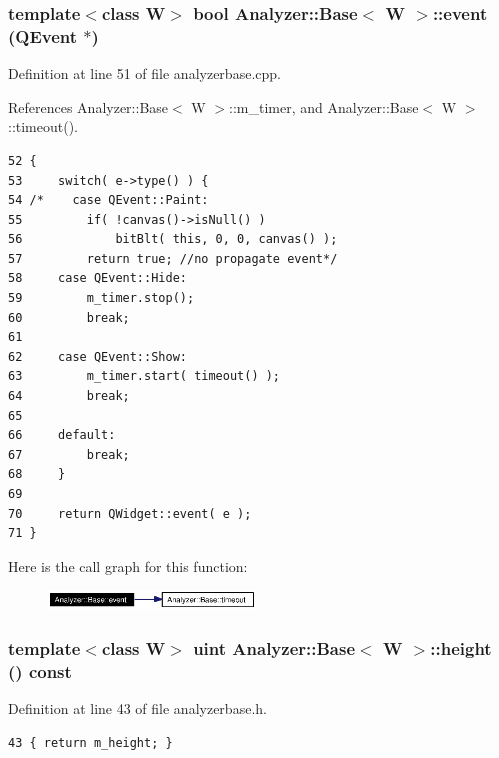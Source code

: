 \subsubsection{\setlength{\rightskip}{0pt plus 5cm}template$<$class W$>$ bool {\bf Analyzer::Base}$<$ W $>$::event (QEvent $\ast$)\hspace{0.3cm}{\tt  [private]}}\label{classAnalyzer_1_1Base_Analyzer_1_1Based0}




Definition at line 51 of file analyzerbase.cpp.

References Analyzer::Base$<$ W $>$::m\_\-timer, and Analyzer::Base$<$ W $>$::timeout().



\footnotesize\begin{verbatim}52 {
53     switch( e->type() ) {
54 /*    case QEvent::Paint:
55         if( !canvas()->isNull() )
56             bitBlt( this, 0, 0, canvas() );
57         return true; //no propagate event*/
58     case QEvent::Hide:
59         m_timer.stop();
60         break;
61 
62     case QEvent::Show:
63         m_timer.start( timeout() );
64         break;
65 
66     default:
67         break;
68     }
69 
70     return QWidget::event( e );
71 }
\end{verbatim}\normalsize 


Here is the call graph for this function:\begin{figure}[H]
\begin{center}
\leavevmode
\includegraphics[width=156pt]{classAnalyzer_1_1Base_Analyzer_1_1Based0_cgraph}
\end{center}
\end{figure}
\subsubsection{\setlength{\rightskip}{0pt plus 5cm}template$<$class W$>$ uint {\bf Analyzer::Base}$<$ W $>$::height () const\hspace{0.3cm}{\tt  [inline]}}\label{classAnalyzer_1_1Base_Analyzer_1_1Basea1}




Definition at line 43 of file analyzerbase.h.



\footnotesize\begin{verbatim}43 { return m_height; }
\end{verbatim}\normalsize 
{}

